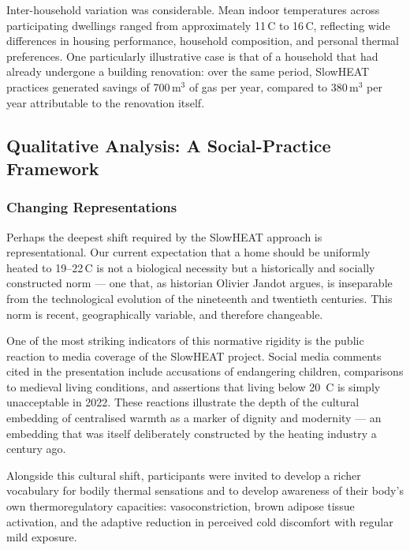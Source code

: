 Inter-household variation was considerable. Mean indoor
temperatures across participating dwellings ranged from
approximately 11\,\textdegree C to 16\,\textdegree C, reflecting
wide differences in housing performance, household composition,
and personal thermal preferences. One particularly illustrative
case is that of a household that had already undergone a building
renovation: over the same period, SlowHEAT practices generated
savings of 700\,m$^3$ of gas per year, compared to 380\,m$^3$
per year attributable to the renovation itself.

\subsection{Qualitative Analysis: A Social-Practice Framework}

\subsubsection{Changing Representations}

Perhaps the deepest shift required by the SlowHEAT approach is
representational. Our current expectation that a home should be
uniformly heated to 19--22\,\textdegree C is not a biological
necessity but a historically and socially constructed norm ---
one that, as historian Olivier Jandot argues, is inseparable from
the technological evolution of the nineteenth and twentieth
centuries. This norm is recent, geographically variable, and
therefore changeable.

One of the most striking indicators of this normative rigidity
is the public reaction to media coverage of the SlowHEAT project.
Social media comments cited in the presentation include
accusations of endangering children, comparisons to medieval
living conditions, and assertions that living below 20\,\textdegree
C is simply unacceptable in 2022. These reactions illustrate the
depth of the cultural embedding of centralised warmth as a marker
of dignity and modernity --- an embedding that was itself
deliberately constructed by the heating industry a century ago.

Alongside this cultural shift, participants were invited to
develop a richer vocabulary for bodily thermal sensations and to
develop awareness of their body's own thermoregulatory capacities:
vasoconstriction, brown adipose tissue activation, and the
adaptive reduction in perceived cold discomfort with regular
mild exposure.

